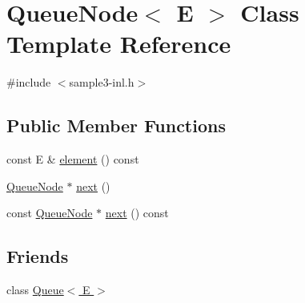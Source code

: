 \hypertarget{class_queue_node}{\section{Queue\-Node$<$ E $>$ Class Template Reference}
\label{class_queue_node}
}


{\ttfamily \#include $<$sample3-\/inl.\-h$>$}

\subsection*{Public Member Functions}
\begin{DoxyCompactItemize}
\item 
const E \& \hyperlink{class_queue_node_a0a51093418d7aefcfc2876bfe217b0fc}{element} () const 
\item 
\hyperlink{class_queue_node}{Queue\-Node} $\ast$ \hyperlink{class_queue_node_a8a9fdf488da06533360999ef85db56ea}{next} ()
\item 
const \hyperlink{class_queue_node}{Queue\-Node} $\ast$ \hyperlink{class_queue_node_a220a47895c5ccc0fb9ae3ef73cfe2512}{next} () const 
\end{DoxyCompactItemize}
\subsection*{Friends}
\begin{DoxyCompactItemize}
\item 
class \hyperlink{class_queue_node_ad4336229b1d7c3626e4ba69f236b202d}{Queue$<$ E $>$}
\end{DoxyCompactItemize}


